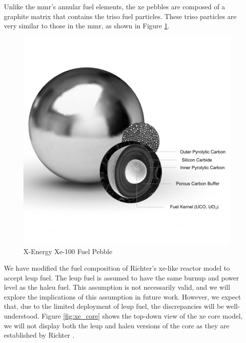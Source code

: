 Unlike the \gls{mmr}'s annular fuel elements, the \gls{xe} pebbles are composed of a graphite matrix that contains the \gls{triso} fuel particles. These \gls{triso} particles are very similar to those in the \gls{mmr}, as shown in Figure \ref{fig:xe_fuel}.

\begin{figure}[!htpb]
    \centering
    \includegraphics[scale=0.28]{images/reactor_design/graphic-triso-x-pebble.jpg}
    \caption{X-Energy Xe-100 Fuel Pebble \cite{xe_fuel}}
    \label{fig:xe_fuel}
\end{figure}


We have modified the fuel composition of Richter's \gls{xe}-like reactor model to accept \gls{leup} fuel. The \gls{leup} fuel is assumed to have the same burnup and power level as the \gls{haleu} fuel. This assumption is not necessarily valid, and we will explore the implications of this assumption in future work. However, we expect that, due to the limited deployment of \gls{leup} fuel, the discrepancies will be well-understood. Figure \ref{fig:xe_core} shows the top-down view of the \gls{xe} core model, we will not display both the \gls{leup} and \gls{haleu} versions of the core as they are established by Richter \cite{richter_thesis_2022}.

